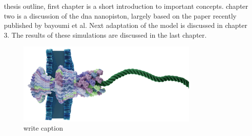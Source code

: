 thesis outline, first chapter is a short introduction to important concepts. chapter two
is a discussion of the dna nanopiston, largely based on the paper recently published by
bayoumi et al. Next adaptation of the model is discussed in chapter 3. The results of
these simulations are discussed in the last chapter.

\begin{figure}
\begin{center}
  \includegraphics[width=0.80\textwidth]{Figures/flagella.png}
  \caption{write caption}
\end{center}
\end{figure}
